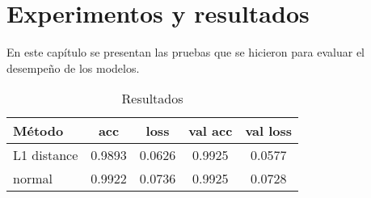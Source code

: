 \chapter{Experimentos y resultados}\label{chapter:implementation}

En este capítulo se presentan las pruebas que se hicieron para evaluar
 el desempeño de los modelos. 

\begin{table}[ht]
    \centering
    \caption{Resultados}
    \begin{tabular}{lcccc}
        \toprule
        \textbf{Método} & \textbf{acc} & \textbf{loss} & \textbf{val acc}  & \textbf{val loss} \\
        \midrule
        L1 distance  &  0.9893 &  0.0626 & 0.9925 & 0.0577 \\
        normal & 0.9922 & 0.0736 & 0.9925 & 0.0728 \\
        \bottomrule
    \end{tabular}
\end{table}
